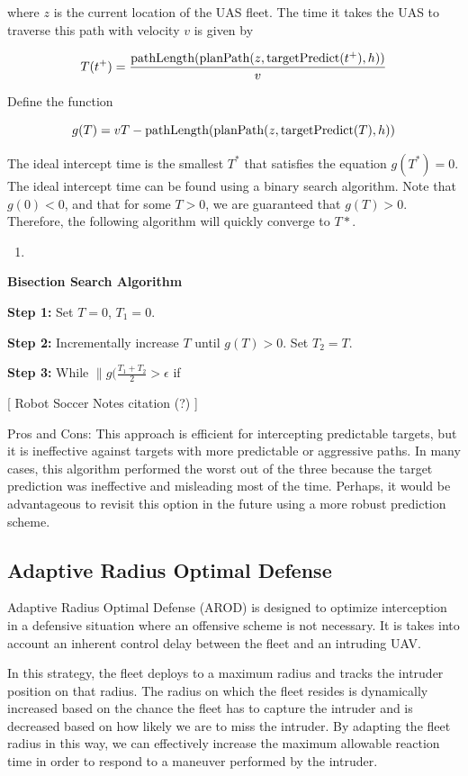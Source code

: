 \documentclass[letterpaper, 10 pt, conference]{ieeeconf}  %
\begin{document}
where $z$ is the current location of the UAS fleet. The time it takes the UAS to traverse this path with velocity $v$ is given by

\[
T(t^+) = \frac{\textnormal{pathLength}(\textnormal{planPath}(z, \textnormal{targetPredict}(t^+),h))}{v}
\]

Define the function

\[
g(T) = vT - \textnormal{pathLength}(\textnormal{planPath}(z, \textnormal{targetPredict}(T),h))
\]

The ideal intercept time is the smallest $T^*$ that satisfies the equation $g(T^*) = 0$. The ideal intercept time can be found using a binary search algorithm. Note that $g(0) < 0$, and that for some $T > 0$, we are guaranteed that $g(T) > 0$. Therefore, the following algorithm will quickly converge to $T*$.
\newline


\begin{enumerate}
\item 
\end{enumerate}
\textbf{Bisection Search Algorithm}

\textbf{Step 1:} Set $T = 0$, $T_1 = 0$.

\textbf{Step 2:} Incrementally increase $T$ until $g(T) > 0$. Set $T_2 = T$.

\textbf{Step 3:} While \(\|g(\frac{T_1 + T_2}{2} > \epsilon\) if 

[ Robot Soccer Notes citation (?) ]

Pros and Cons: This approach is efficient for intercepting predictable targets, but it is ineffective against targets with more predictable or aggressive paths. In many cases, this algorithm performed the worst out of the three because the target prediction was ineffective and misleading most of the time. Perhaps, it would be advantageous to revisit this option in the future using a more robust prediction scheme.


\subsection{Adaptive Radius Optimal Defense}
	Adaptive Radius Optimal Defense (AROD) is designed to optimize interception in a defensive situation where an offensive scheme is not necessary. It is takes into account an inherent control delay between the fleet and an intruding UAV. 
	
    In this strategy, the fleet deploys to a maximum radius and tracks the intruder position on that radius. The radius on which the fleet resides is dynamically increased based on the chance the fleet has to capture the intruder and is decreased based on how likely we are to miss the intruder. By adapting the fleet radius in this way, we can effectively increase the maximum allowable reaction time in order to respond to a maneuver performed by the intruder.
	
\end{document}
